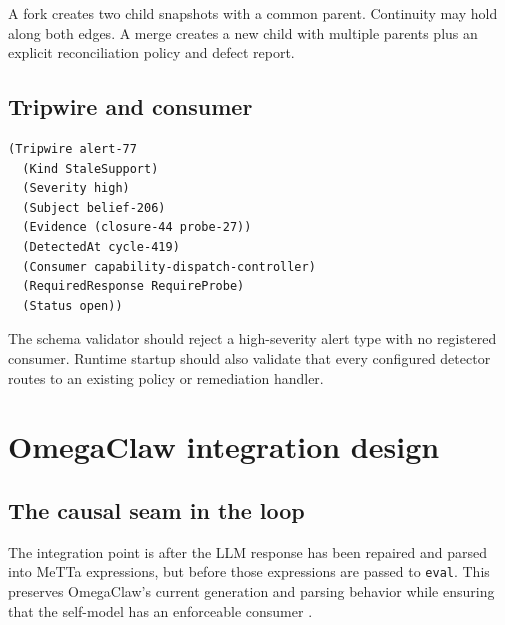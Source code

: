 \documentclass[11pt,oneside]{report}
\begin{document}
A fork creates two child snapshots with a common parent. Continuity may hold along both edges. A merge creates a new child with multiple parents plus an explicit reconciliation policy and defect report.

\section{Tripwire and consumer}

\begin{lstlisting}[language=Metta,caption={Tripwire with mandatory consumer}]
(Tripwire alert-77
  (Kind StaleSupport)
  (Severity high)
  (Subject belief-206)
  (Evidence (closure-44 probe-27))
  (DetectedAt cycle-419)
  (Consumer capability-dispatch-controller)
  (RequiredResponse RequireProbe)
  (Status open))
\end{lstlisting}

The schema validator should reject a high-severity alert type with no registered consumer. Runtime startup should also validate that every configured detector routes to an existing policy or remediation handler.

\chapter{OmegaClaw integration design}

\section{The causal seam in the loop}

The integration point is after the LLM response has been repaired and parsed into MeTTa expressions, but before those expressions are passed to \texttt{eval}. This preserves OmegaClaw's current generation and parsing behavior while ensuring that the self-model has an enforceable consumer \cite{omegaclaw-loop,omegaclaw-dispatch}.
\end{document}
